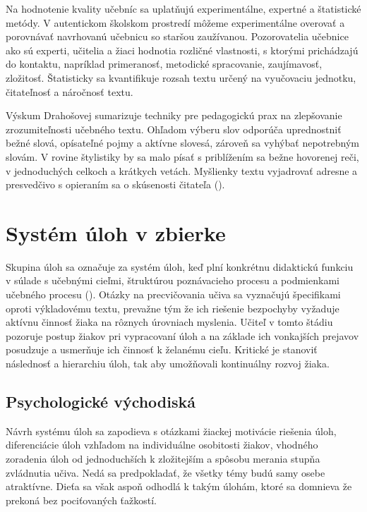 Na hodnotenie kvality učebníc sa uplatňujú experimentálne, expertné a štatistické metódy. V autentickom školskom prostredí môžeme experimentálne overovať a porovnávať navrhovanú učebnicu so staršou zaužívanou. Pozorovatelia učebnice ako sú experti, učitelia a žiaci hodnotia rozličné vlastnosti, s ktorými prichádzajú do kontaktu, napríklad primeranosť, metodické spracovanie, zaujímavosť, zložitosť. Štatisticky sa kvantifikuje rozsah textu určený na vyučovaciu jednotku, čitateľnosť a náročnosť textu.

Výskum Drahošovej sumarizuje techniky pre pedagogickú prax na zlepšovanie zrozumiteľnosti učebného textu. Ohľadom výberu slov odporúča uprednostniť bežné slová, opísateľné pojmy a aktívne slovesá, zároveň sa vyhýbať nepotrebným slovám. V rovine štylistiky by sa malo písať s priblížením sa bežne hovorenej reči, v jednoduchých celkoch a krátkych vetách. Myšlienky textu vyjadrovať adresne a presvedčivo s opieraním sa o skúsenosti čitateľa (\cite{drahosova_hodnotenie_2014}).

\section{Systém úloh v zbierke}
Skupina úloh sa označuje za systém úloh, keď plní konkrétnu didaktickú funkciu v súlade s učebnými cieľmi, štruktúrou poznávacieho procesu a podmienkami učebného procesu (\cite{mindakova_tvorba_2008}). Otázky na precvičovania učiva sa vyznačujú špecifikami oproti výkladovému textu, prevažne tým že ich riešenie bezpochyby vyžaduje aktívnu činnosť žiaka na rôznych úrovniach myslenia. Učiteľ v tomto štádiu pozoruje postup žiakov pri vypracovaní úloh a na základe ich vonkajších prejavov posudzuje a usmerňuje ich činnosť k želanému cieľu. Kritické je stanoviť následnosť a hierarchiu úloh, tak aby umožňovali kontinuálny rozvoj žiaka.  

\subsection{Psychologické východiská}
Návrh systému úloh sa zapodieva s otázkami žiackej motivácie riešenia úloh, diferenciácie úloh vzhľadom na individuálne osobitosti žiakov, vhodného zoradenia úloh od jednoduchších k zložitejším a spôsobu merania stupňa zvládnutia učiva. Nedá sa predpokladať, že všetky témy budú samy osebe atraktívne. Dieťa sa však aspoň odhodlá k takým úlohám, ktoré sa domnieva že prekoná bez pociťovaných ťažkostí.

